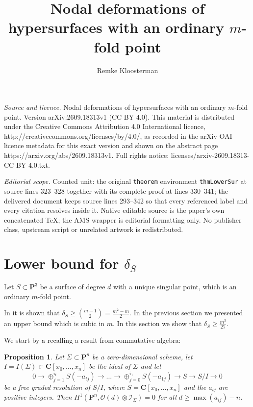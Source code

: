 \documentclass[10pt,a4paper]{amsart}
\newcommand{\Ps}{\mathbf{P}}
\newcommand{\C}{\mathbf{C}}
\newcommand{\cO}{\mathcal{O}}
\newcommand{\cI}{\mathcal{I}}
\newtheorem{proposition}[lemma]{Proposition}
\begin{document}
\title[Nodal deformations of hypersurfaces with an ordinary m-fold ]{Nodal deformations of hypersurfaces with an ordinary $m$-fold point}
\author{Remke Kloosterman}
\date{}
\maketitle
\noindent\emph{Source and licence.} Nodal deformations of hypersurfaces with an ordinary $m$-fold point. Version arXiv:2609.18313v1 (CC BY 4.0). This material is distributed under the Creative Commons Attribution 4.0 International licence, http://creativecommons.org/licenses/by/4.0/, as recorded in the arXiv OAI licence metadata for this exact version and shown on the abstract page https://arxiv.org/abs/2609.18313v1. Full rights notice: licenses/arxiv-2609.18313-CC-BY-4.0.txt.\par\smallskip
\noindent\textit{Editorial scope.} Counted unit: the original \texttt{theorem} environment \texttt{thmLowerSur} at source lines 323--328 together with its complete proof at lines 330--341; the delivered document keeps source lines 293--342 so that every referenced label and every citation resolves inside it. Native editable source is the paper's own concatenated TeX; the AMS wrapper is editorial formatting only. No publisher class, upstream script or unrelated artwork is redistributed.
\section{Lower bound for $\delta_S$}\label{secLower}
Let $S\subset \Ps^3$ be a surface of degree $d$ with a unique singular point, which is an ordinary $m$-fold point.

In \cite{CiGa26} it is shown that $\delta_S\geq \binom{m-1}{2}=\frac{m^2-m}{2}$. In the previous section we presented an upper bound which is cubic in $m$. 
In this section we show that  $\delta_S\geq \frac{m^3}{27}$.

We start by a recalling a result from commutative algebra:

\begin{proposition} Let $\Sigma\subset \Ps^n$ be a zero-dimensional scheme, let $I=I(\Sigma)\subset \C[x_0,\dots,x_n]$ be the ideal of $\Sigma$ and let 
\[ 0 \to \oplus_{j=1}^{i_t} S(-a_{tj}) \to \dots \to \oplus_{j=0}^{i_1}S(-a_{1j}) \to S \to S/I \to 0\]
be a free graded resolution of $S/I$, where $S=\C[x_0,\dots, x_n]$ and the $a_{ij}$ are positive integers.
Then $H^1(\Ps^n,\cO(d)\otimes \cI_{\Sigma})=0$ for all $d\geq \max(a_{ij})-n$.
\end{proposition}
\end{document}
